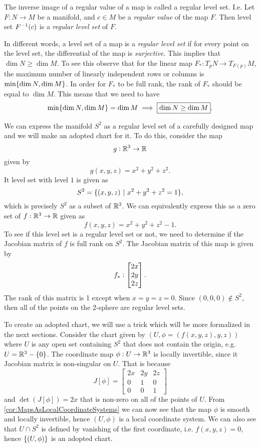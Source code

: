 \begin{definition}
	The inverse image of a regular value of a map is called a regular level set. I.e. Let $ F: N \to M $ be a manifold, and $ c \in M $ be a \emph{regular value} of the map $ F $. Then level set $  F^{-1}(c) $ is a \emph{regular level set} of $ F $.  
\end{definition}
\begin{remark}
	In different words, a level set of a map is a \emph{regular level set} if for every point on the level set, the differential of the map is \emph{surjective}. This implies that $ \dim N \geq \dim M $. To see this observe that for the linear map $ F_*: T_pN \to T_{F(p)}M $, the maximum number of linearly independent rows or columns is $ \min\{\dim N, \dim M\} $. In order for $ F_* $ to be full rank, the rank of $ F_* $  should be equal to $ \dim M $. This means that we need to have
	\[ \min\{\dim N, \dim M\} = \dim M \implies \boxed{\dim N \geq \dim M}. \]
\end{remark}

\begin{example}[$ S^2 $ in $ \R^3 $]
	We can express the manifold $ S^2 $ as a regular level set of a carefully designed map and we will make an adopted chart for it. To do this, consider the map
	\[ g: \mathbb{R}^3 \to \mathbb{R} \] 
	given by
	\[ g(x,y,z) = x^2+y^2+z^2 . \]
	It level set with level $ 1 $ is given as
	\[ S^2 = \set{(x,y,z)\ |\ x^2+y^2+z^2 = 1}, \]
	which is precisely $ S^2 $ as a subset of $ \R^3 $. We can equivalently express this as a zero set of $ f: \mathbb{R}^3 \to \mathbb{R} $  given as
	\[ f(x,y,z) = x^2+y^2+z^2 - 1. \]
	To see if this level set is a regular level set or not, we need to determine if the Jacobian matrix of $ f $ is full rank on $ S^2 $. The Jacobian matrix of this map is given by
	\[ f_*: \begin{bmatrix} 2x \\ 2y \\ 2z \end{bmatrix}. \]
	The rank of this matrix is 1 except when $ x=y=z=0 $. Since $ (0,0,0) \notin S^2 $, then all of the points on the 2-sphere are regular level sets. 
	
	To create an adopted chart, we will use a trick which will be more formalized in the next sections. Consider the chart given by $ (U,\phi=(f(x,y,z),y,z)) $ where $ U $ is any open set containing $ S^2 $ that does not contain the origin, e.g. $ U = \mathbb{R}^3 - \{0\} $. The coordinate map $ \phi:U \to \mathbb{R}^3 $ is locally invertible, since it Jacobian matrix is non-singular on $ U $. That is because
	\[ J[\phi] = \begin{bmatrix}
		2x & 2y & 2z \\
		0 & 1 & 0 \\ 
		0 & 0 & 1
	\end{bmatrix} \]
	and $ \det(J[\phi]) = 2x $ that is non-zero on all of the points of $ U $. From \autoref{cor:MapsAsLocalCoordinateSystems} we can now see that the map $ \phi $ is smooth and locally invertible, hence $ (U,\phi) $ is a local coordinate system. We can also see that $ U \cap S^2 $ is defined by vanishing of the first coordinate, i.e. $ f(x,y,z) = 0 $, hence $ \{(U,\phi)\} $ is an adopted chart.
	
\end{example}



